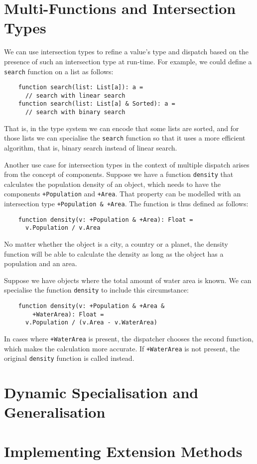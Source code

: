 \section{Multi-Functions and Intersection Types}

We can use intersection types to refine a value's type and dispatch based on the presence of such an intersection type at run-time. For example, we could define a \texttt{search} function on a list as follows:
\begin{lstlisting}
    function search(list: List[a]): a =
      // search with linear search
    function search(list: List[a] & Sorted): a =
      // search with binary search
\end{lstlisting}

\noindent That is, in the type system we can encode that some lists are sorted, and for those lists we can specialise the \texttt{search} function so that it uses a more efficient algorithm, that is, binary search instead of linear search.

\medskip

\noindent Another use case for intersection types in the context of multiple dispatch arises from the concept of components. Suppose we have a function \texttt{density} that calculates the population density of an object, which needs to have the components \texttt{+Population} and \texttt{+Area}. That property can be modelled with an intersection type \texttt{+Population \& +Area}. The function is thus defined as follows:
\begin{lstlisting}
    function density(v: +Population & +Area): Float = 
      v.Population / v.Area
\end{lstlisting}

\noindent No matter whether the object is a city, a country or a planet, the density function will be able to calculate the density as long as the object has a population and an area.

Suppose we have objects where the total amount of water area is known. We can specialise the function \texttt{density} to include this circumstance:
\begin{lstlisting}
    function density(v: +Population & +Area & 
        +WaterArea): Float =
      v.Population / (v.Area - v.WaterArea)
\end{lstlisting}

\noindent In cases where \texttt{+WaterArea} is present, the dispatcher chooses the second function, which makes the calculation more accurate. If \texttt{+WaterArea} is not present, the original \texttt{density} function is called instead.



\section{Dynamic Specialisation and Generalisation}




\section{Implementing Extension Methods}




